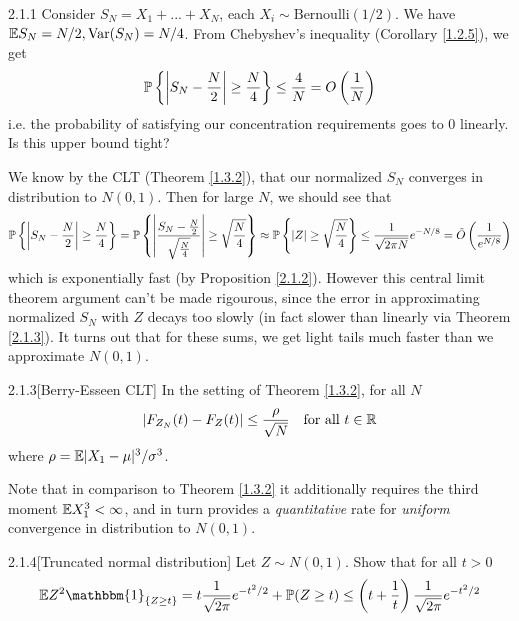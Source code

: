 {\begin{eg}{2.1.1}\label{2.1.1}
Consider $S_N = X_1 + ... + X_N$, each $X_i \sim \text{Bernoulli}(1/2)$. We have $\mathbb{E} S_N = N/2, \text{Var} (S_N) = N/4$. From Chebyshev's inequality (Corollary \ref{1.2.5}), we get
\begin{align*}
    \mathbb{P} \left\{ \left|S_N - \frac N 2\right| \geq \frac N 4 \right\} \leq \frac 4 N = O\left(\frac1N\right)
\end{align*}
i.e. the probability of satisfying our concentration requirements goes to 0 linearly. Is this upper bound tight?

We know by the CLT (Theorem \ref{1.3.2}), that our normalized $S_N$ converges in distribution to $N(0,1)$. Then for large $N$, we should see that
\begin{align*}
    \mathbb{P} \left\{ \left|S_N - \frac N 2\right| \geq \frac N 4\right\} = \mathbb{P} \left\{\left|\frac {S_N - \frac N 2}{\sqrt{\frac N 4}}\right| \geq \sqrt{\frac N 4} \right\} \approx \mathbb{P} \left\{ |Z| \geq \sqrt{\frac N 4} \right\} \leq \frac 1 {\sqrt{2 \pi N}}e^{-N/8} = \tilde{O}\left(\frac 1 {e^{N/8}}\right)
\end{align*}
which is exponentially fast (by Proposition \ref{2.1.2}). However this central limit theorem argument can't be made rigourous, since the error in approximating normalized $S_N$ with $Z$ decays too slowly (in fact slower than linearly via Theorem \ref{2.1.3}). It turns out that for these sums, we get light tails much faster than we approximate $N(0,1)$.

\end{eg}

\begin{thm}{2.1.3}[Berry-Esseen CLT]\label{2.1.3}
In the setting of Theorem \ref{1.3.2}, for all $N$
\begin{align*}
    |F_{Z_N}(t) - F_Z(t)| \leq  \frac \rho {\sqrt{N}} \quad\text{for all $t\in\mathbb{R}$}
\end{align*}
where $\rho = \mathbb{E} |X_1 - \mu|^3/\sigma^3$.
\end{thm}
Note that in comparison to Theorem \ref{1.3.2} it additionally requires the third moment $\mathbb{E} X_1^3 < \infty$, and in turn provides a \textit{quantitative} rate for \textit{uniform} convergence in distribution to $N(0,1)$.


\begin{ex}{2.1.4}[Truncated normal distribution]
Let $Z \sim N(0,1)$. Show that for all $t> 0$
\begin{align*}
    \E Z^2 \mathbbm{1}_{\{Z\geq t\}} = t \frac1{\sqrt{2\pi}}e^{-t^2/2} + \P(Z \geq t) \leq \l(t + \frac1t \r) \frac 1 {\sqrt{2\pi}} e^{-t^2/2}
\end{align*}
\end{ex}

}
